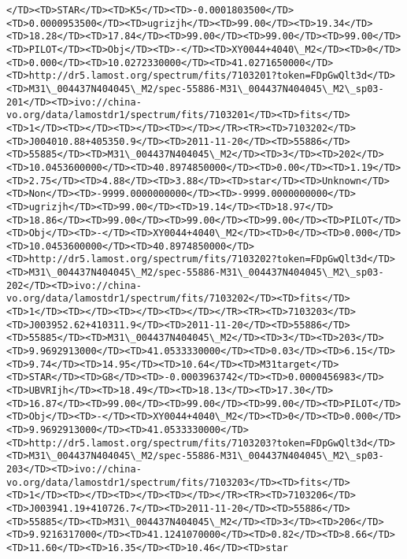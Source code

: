 \documentclass[11pt]{article}
\begin{document}
\begin{Verbatim}[commandchars=\\\{\}]
</TD><TD>STAR</TD><TD>K5</TD><TD>-0.0001803500</TD><TD>0.0000953500</TD><TD>ugrizjh</TD><TD>99.00</TD><TD>19.34</TD><TD>18.28</TD><TD>17.84</TD><TD>99.00</TD><TD>99.00</TD><TD>99.00</TD><TD>PILOT</TD><TD>Obj</TD><TD>-</TD><TD>XY0044+4040\_M2</TD><TD>0</TD><TD>0.000</TD><TD>10.0272330000</TD><TD>41.0271650000</TD><TD>http://dr5.lamost.org/spectrum/fits/7103201?token=FDpGwQlt3d</TD><TD>M31\_004437N404045\_M2/spec-55886-M31\_004437N404045\_M2\_sp03-201</TD><TD>ivo://china-vo.org/data/lamostdr1/spectrum/fits/7103201</TD><TD>fits</TD><TD>1</TD><TD></TD><TD></TD><TD></TD></TR><TR><TD>7103202</TD><TD>J004010.88+405350.9</TD><TD>2011-11-20</TD><TD>55886</TD><TD>55885</TD><TD>M31\_004437N404045\_M2</TD><TD>3</TD><TD>202</TD><TD>10.0453600000</TD><TD>40.8974850000</TD><TD>0.00</TD><TD>1.19</TD><TD>2.75</TD><TD>4.88</TD><TD>3.88</TD><TD>star</TD><TD>Unknown</TD><TD>Non</TD><TD>-9999.0000000000</TD><TD>-9999.0000000000</TD><TD>ugrizjh</TD><TD>99.00</TD><TD>19.14</TD><TD>18.97</TD><TD>18.86</TD><TD>99.00</TD><TD>99.00</TD><TD>99.00</TD><TD>PILOT</TD><TD>Obj</TD><TD>-</TD><TD>XY0044+4040\_M2</TD><TD>0</TD><TD>0.000</TD><TD>10.0453600000</TD><TD>40.8974850000</TD><TD>http://dr5.lamost.org/spectrum/fits/7103202?token=FDpGwQlt3d</TD><TD>M31\_004437N404045\_M2/spec-55886-M31\_004437N404045\_M2\_sp03-202</TD><TD>ivo://china-vo.org/data/lamostdr1/spectrum/fits/7103202</TD><TD>fits</TD><TD>1</TD><TD></TD><TD></TD><TD></TD></TR><TR><TD>7103203</TD><TD>J003952.62+410311.9</TD><TD>2011-11-20</TD><TD>55886</TD><TD>55885</TD><TD>M31\_004437N404045\_M2</TD><TD>3</TD><TD>203</TD><TD>9.9692913000</TD><TD>41.0533330000</TD><TD>0.03</TD><TD>6.15</TD><TD>9.74</TD><TD>14.95</TD><TD>10.64</TD><TD>M31target</TD><TD>STAR</TD><TD>G8</TD><TD>-0.0003963742</TD><TD>0.0000456983</TD><TD>UBVRIjh</TD><TD>18.49</TD><TD>18.13</TD><TD>17.30</TD><TD>16.87</TD><TD>99.00</TD><TD>99.00</TD><TD>99.00</TD><TD>PILOT</TD><TD>Obj</TD><TD>-</TD><TD>XY0044+4040\_M2</TD><TD>0</TD><TD>0.000</TD><TD>9.9692913000</TD><TD>41.0533330000</TD><TD>http://dr5.lamost.org/spectrum/fits/7103203?token=FDpGwQlt3d</TD><TD>M31\_004437N404045\_M2/spec-55886-M31\_004437N404045\_M2\_sp03-203</TD><TD>ivo://china-vo.org/data/lamostdr1/spectrum/fits/7103203</TD><TD>fits</TD><TD>1</TD><TD></TD><TD></TD><TD></TD></TR><TR><TD>7103206</TD><TD>J003941.19+410726.7</TD><TD>2011-11-20</TD><TD>55886</TD><TD>55885</TD><TD>M31\_004437N404045\_M2</TD><TD>3</TD><TD>206</TD><TD>9.9216317000</TD><TD>41.1241070000</TD><TD>0.82</TD><TD>8.66</TD><TD>11.60</TD><TD>16.35</TD><TD>10.46</TD><TD>star     
\end{Verbatim}
\end{document}
